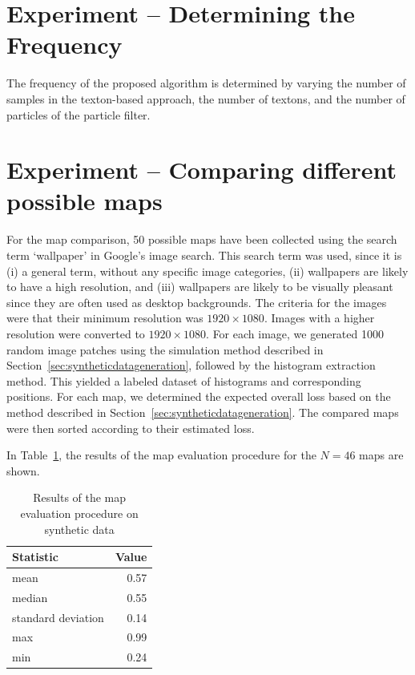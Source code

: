 \documentclass[11pt]{report}
\begin{document}
\section{Experiment -- Determining the Frequency}

The frequency of the proposed algorithm is determined by varying the
number of samples in the texton-based approach, the number of textons,
and the number of particles of the particle filter.

\section{Experiment -- Comparing different possible maps}

For the map comparison, 50 possible maps have been collected using the
search term `wallpaper' in Google's image search. This search term was
used, since it is (i) a general term, without any specific image
categories, (ii) wallpapers are likely to have a high resolution, and
(iii) wallpapers are likely to be visually pleasant since they are
often used as desktop backgrounds. The criteria for the images were
that their minimum resolution was $1920 \times 1080$. Images with a
higher resolution were converted to $1920 \times 1080$.  For each
image, we generated 1000 random image patches using the simulation
method described in Section~\ref{sec:syntheticdatageneration},
followed by the histogram extraction method. This yielded a labeled
dataset of histograms and corresponding positions. For each map, we
determined the expected overall loss based on the method described in
Section~\ref{sec:syntheticdatageneration}. The compared maps were then
sorted according to their estimated loss.



In Table~\ref{tab:mapeval}, the results of the map evaluation
procedure for the $N = 46$ maps are shown.

\begin{table}[h]
  \centering
  \begin{tabular}{lr}
    \toprule
    Statistic & Value\\
    \midrule
    mean & 0.57\\
    median & 0.55\\
    standard deviation & 0.14\\
    max & 0.99\\
    min & 0.24\\    
    \bottomrule
  \end{tabular}
  \caption[Map evaluation procedure on synthetic data]{Results of the map evaluation procedure on synthetic data}
  \label{tab:mapeval}

\end{table}
\end{document}
